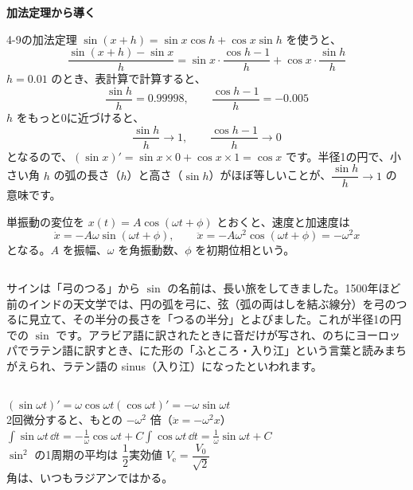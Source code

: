 \begin{motto}[4]
\textbf{加法定理から導く}\par
4-9の加法定理 $\sin(x+h)=\sin x\cos h+\cos x\sin h$ を使うと、
\[ \frac{\sin(x+h)-\sin x}{h}=\sin x\cdot\frac{\cos h-1}{h}+\cos x\cdot\frac{\sin h}{h} \]
$h=0.01$ のとき、表計算で計算すると、
\[ \frac{\sin h}{h}=0.99998,\qquad \frac{\cos h-1}{h}=-0.005 \]
$h$ をもっと0に近づけると、
\[ \frac{\sin h}{h}\to1,\qquad \frac{\cos h-1}{h}\to0 \]
となるので、$(\sin x)'=\sin x\times0+\cos x\times1=\cos x$ です。半径1の円で、小さい角 $h$ の弧の長さ（$h$）と高さ（$\sin h$）がほぼ等しいことが、$\dfrac{\sin h}{h}\to1$ の意味です。
\end{motto}

\begin{senmonsho}[大学の教科書ふうの書き方]
\begin{bkhonbun}
単振動の変位を $x(t)=A\cos(\omega t+\phi)$ とおくと、速度と加速度は
\[ \dot{x}=-A\omega\sin(\omega t+\phi),\qquad \ddot{x}=-A\omega^2\cos(\omega t+\phi)=-\omega^2x \tag{2.3} \]
となる。$A$ を振幅、$\omega$ を角振動数、$\phi$ を初期位相という。
\end{bkhonbun}
\end{senmonsho}

\begin{column}{サインは「弓のつる」から}
$\sin$ の名前は、長い旅をしてきました。1500年ほど前のインドの天文学では、円の弧を弓に、弦（弧の両はしを結ぶ線分）を弓のつるに見立て、その半分の長さを「つるの半分」とよびました。これが半径1の円での $\sin$ です。アラビア語に訳されたときに音だけが写され、のちにヨーロッパでラテン語に訳すとき、にた形の「ふところ・入り江」という言葉と読みまちがえられ、ラテン語の sinus（入り江）になったといわれます。
\end{column}

{}

\begin{taisetsu}
\def\tsl#1{\makebox[3.2\zw][l]{\sffamily\bfseries\small\color{bkTheme}#1}}
\tsl{微分}$(\sin\omega t)'=\omega\cos\omega t$\qquad $(\cos\omega t)'=-\omega\sin\omega t$\\[3pt]
\tsl{}2回微分すると、もとの $-\omega^2$ 倍（$\ddot{x}=-\omega^2x$）\\[3pt]
\tsl{積分}$\displaystyle\int\sin\omega t\,\dd t=-\frac{1}{\omega}\cos\omega t+C$\qquad $\displaystyle\int\cos\omega t\,\dd t=\frac{1}{\omega}\sin\omega t+C$\\[3pt]
\tsl{平均}$\sin^2$ の1周期の平均は $\dfrac{1}{2}$\qquad 実効値 $V_{\mathrm{e}}=\dfrac{V_0}{\sqrt2}$\\[3pt]
\tsl{}角は、いつもラジアンではかる。
\end{taisetsu}

